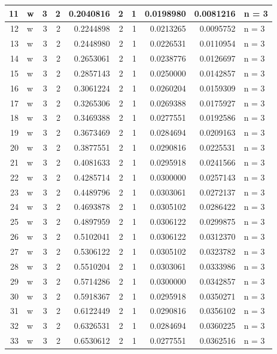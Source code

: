\documentclass[
  letterpaper,
  DIV=11,
  numbers=noendperiod]{scrreprt}
\begin{document}
\begin{table}
\begin{tabular}[t]{r|l|r|r|r|r|r|r|r|l}
\hline
11 & w & 3 & 2 & 0.2040816 & 2 & 1 & 0.0198980 & 0.0081216 & n = 3\\
\hline
12 & w & 3 & 2 & 0.2244898 & 2 & 1 & 0.0213265 & 0.0095752 & n = 3\\
\hline
13 & w & 3 & 2 & 0.2448980 & 2 & 1 & 0.0226531 & 0.0110954 & n = 3\\
\hline
14 & w & 3 & 2 & 0.2653061 & 2 & 1 & 0.0238776 & 0.0126697 & n = 3\\
\hline
15 & w & 3 & 2 & 0.2857143 & 2 & 1 & 0.0250000 & 0.0142857 & n = 3\\
\hline
16 & w & 3 & 2 & 0.3061224 & 2 & 1 & 0.0260204 & 0.0159309 & n = 3\\
\hline
17 & w & 3 & 2 & 0.3265306 & 2 & 1 & 0.0269388 & 0.0175927 & n = 3\\
\hline
18 & w & 3 & 2 & 0.3469388 & 2 & 1 & 0.0277551 & 0.0192586 & n = 3\\
\hline
19 & w & 3 & 2 & 0.3673469 & 2 & 1 & 0.0284694 & 0.0209163 & n = 3\\
\hline
20 & w & 3 & 2 & 0.3877551 & 2 & 1 & 0.0290816 & 0.0225531 & n = 3\\
\hline
21 & w & 3 & 2 & 0.4081633 & 2 & 1 & 0.0295918 & 0.0241566 & n = 3\\
\hline
22 & w & 3 & 2 & 0.4285714 & 2 & 1 & 0.0300000 & 0.0257143 & n = 3\\
\hline
23 & w & 3 & 2 & 0.4489796 & 2 & 1 & 0.0303061 & 0.0272137 & n = 3\\
\hline
24 & w & 3 & 2 & 0.4693878 & 2 & 1 & 0.0305102 & 0.0286422 & n = 3\\
\hline
25 & w & 3 & 2 & 0.4897959 & 2 & 1 & 0.0306122 & 0.0299875 & n = 3\\
\hline
26 & w & 3 & 2 & 0.5102041 & 2 & 1 & 0.0306122 & 0.0312370 & n = 3\\
\hline
27 & w & 3 & 2 & 0.5306122 & 2 & 1 & 0.0305102 & 0.0323782 & n = 3\\
\hline
28 & w & 3 & 2 & 0.5510204 & 2 & 1 & 0.0303061 & 0.0333986 & n = 3\\
\hline
29 & w & 3 & 2 & 0.5714286 & 2 & 1 & 0.0300000 & 0.0342857 & n = 3\\
\hline
30 & w & 3 & 2 & 0.5918367 & 2 & 1 & 0.0295918 & 0.0350271 & n = 3\\
\hline
31 & w & 3 & 2 & 0.6122449 & 2 & 1 & 0.0290816 & 0.0356102 & n = 3\\
\hline
32 & w & 3 & 2 & 0.6326531 & 2 & 1 & 0.0284694 & 0.0360225 & n = 3\\
\hline
33 & w & 3 & 2 & 0.6530612 & 2 & 1 & 0.0277551 & 0.0362516 & n = 3\\

\end{tabular}
\end{table}
\end{document}
